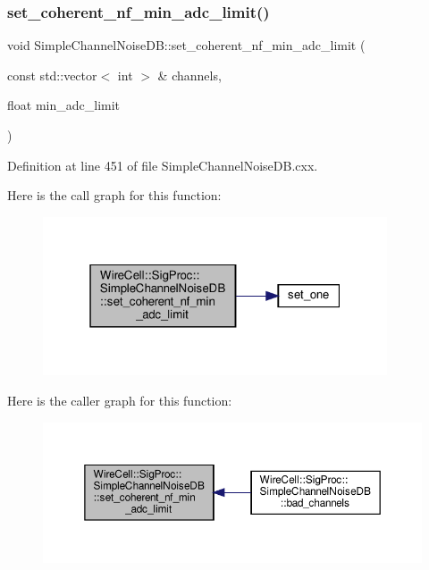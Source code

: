 \subsubsection{\texorpdfstring{set\+\_\+coherent\+\_\+nf\+\_\+min\+\_\+adc\+\_\+limit()}{set\_coherent\_nf\_min\_adc\_limit()}}
{\footnotesize\ttfamily void Simple\+Channel\+Noise\+D\+B\+::set\+\_\+coherent\+\_\+nf\+\_\+min\+\_\+adc\+\_\+limit (\begin{DoxyParamCaption}\item[{const std\+::vector$<$ int $>$ \&}]{channels,  }\item[{float}]{min\+\_\+adc\+\_\+limit }\end{DoxyParamCaption})}



Definition at line 451 of file Simple\+Channel\+Noise\+D\+B.\+cxx.

Here is the call graph for this function\+:
\nopagebreak
\begin{figure}[H]
\begin{center}
\leavevmode
\includegraphics[width=289pt]{class_wire_cell_1_1_sig_proc_1_1_simple_channel_noise_d_b_a045c735c118842078036c1619a637525_cgraph}
\end{center}
\end{figure}
Here is the caller graph for this function\+:
\nopagebreak
\begin{figure}[H]
\begin{center}
\leavevmode
\includegraphics[width=350pt]{class_wire_cell_1_1_sig_proc_1_1_simple_channel_noise_d_b_a045c735c118842078036c1619a637525_icgraph}
\end{center}
\end{figure}
\mbox{\label{class_wire_cell_1_1_sig_proc_1_1_simple_channel_noise_d_b_a1a1ea9a4e47ddfe6c88f9eec682776bf}} 
